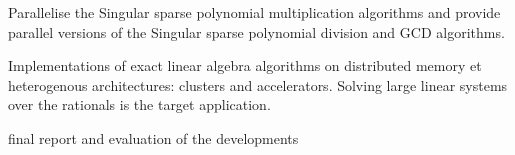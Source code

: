 \begin{workpackage}
\begin{wpdelivs}
\begin{wpdeliv}[due=47,id=GAP-software-final,dissem=PU,nature=OTHER,lead=SA]
  \end{wpdeliv}
  \begin{wpdeliv}[due=48,id=singular-polyarith,dissem=PU,nature=DEM, lead=UK]
      {Parallelise the Singular sparse polynomial multiplication algorithms and
        provide parallel versions of the Singular sparse polynomial division and GCD algorithms.}
\end{wpdeliv}
  \begin{wpdeliv}[due=48,id=LinBox-distributed,dissem=PU,nature=DEM, lead=UJF]
    {Implementations of exact linear algebra algorithms on distributed memory et heterogenous
      architectures: clusters and accelerators. Solving large linear systems
      over the rationals is the target application.} 
  \end{wpdeliv}
  \begin{wpdeliv}[due=48,id=GAP-APIs-report,dissem=PU,nature=R,lead=SA]
      {final report and evaluation of the \GAP developments}
  \end{wpdeliv}
\end{wpdelivs}
\end{workpackage}


